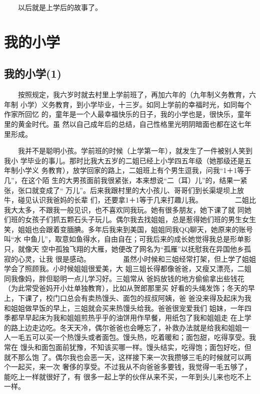 \documentclass[12pt]{book}
\begin{document}
　　以后就是上学后的故事了。
\section{我的小学}
\label{sec-2-2}
\subsection{我的小学(1)}
\label{sec-2-2-1}

　　按照规定，我六岁时就去村里上学前班了，再加六年的（九年制义务教育，六年制
小学）义务教育，到小学毕业，十三岁。如同上学前的幸福时光，如同每个作家所回忆
的，童年是一个人最幸福快乐的日子，我的小学也是，很快乐，童年里的黄金时代。虽
然以自己成年后的总结，自己性格里光明阴暗面也都在这七年里形成。

　　我并不是聪明小孩。学前班的时候（上学第一年），就发生了一件被别人笑到我小
学毕业的事儿。那时比我大五岁的二姐已经上小学四五年级（她那级还是五年制小学义
务教育），放学回家的路上，二姐班上有个男生逗我，问我“1＋1等于几”，在这个陌
生的大男孩面前我很紧张，本来想说“二（耳）儿”的，结果一紧张，张口就变成了“
万儿”。后来我跟村里的大小孩儿、哥哥们到长渠堤坝上放牛，碰见认识我爸妈的长辈
们，还要拿1＋1等于几来打趣儿我。
　　
　　二姐比我大太多，不跟我一般见识，也不喜欢同我玩。她有很多朋友，她下课了就
同她们班的女孩子们抓五颗石头子玩儿。偶尔我去找姐姐，总是惹得她们班的男生女生
笑，姐姐也会跟着变腼腆。多年后我来到美国，姐姐同我QQ聊天，她原来的账号叫“水
中鱼儿”，取意如鱼得水，自由自在；可我后来的成长她觉得我总是形单影只，就像天
空中孤独飞翔的大雁，她便改了网名为“孤雁”以抚慰我在异国他乡孤寂的心灵，让我
很是感动。
　　
　　虽然小时候和三姐经常打架，但上学了姐姐学会了照顾我。小时候姐姐很爱美，大
姐三姐长得都像爸爸，又瘦又漂亮，二姐同我像妈，胖但聪明一点儿学习好。三姐常从
爸妈放钱的地方偷偷拿出些钱花（为此常受爸妈开小灶单独教育），比如从贺郎那里买
好看的头绳发饰；冬天的早上，下课了，校门口总会有卖热馒头、面包的叔叔阿姨，爸
爸没来得及起床为我和姐姐做早饭的早上，三姐就会买来热馒头给我。爸爸很宠爱我们
姐妹，一年四季都早早起床为我和姐姐煎热乎乎的油饼用作早餐，用纸包了我和姐姐走
在上学的路上边走边吃。冬天天冷，偶尔爸爸也会睡忘了，补救办法就是给我和姐姐一
人一毛五可以买一个热馒头或者面包。馒头热，吃着暖和；面包甜，吃得享受。我常在
馒头和面包面前犹豫，不知该买哪一样。馒头结实，吃得饱；面包好吃，但就不那么饱
了。偶尔我也会恶一天，这样接下来一次我攒够三毛的时候就可以两个一起买，来一次
奢侈的享受。不过我从不向爸爸多要钱，我觉得一毛五够了，能吃上一样就很好了，有
很多一起上学的伙伴从来不买，一年到头儿来也吃不上一样。
\end{document}
